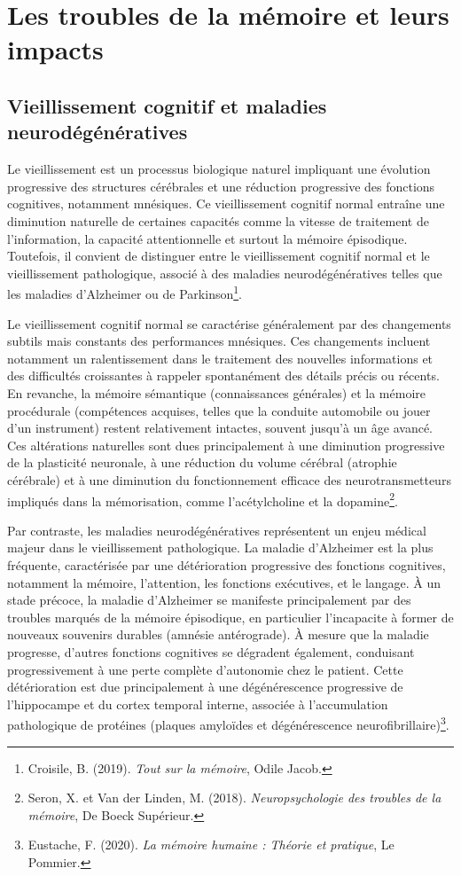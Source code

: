 \documentclass[12pt,a4paper]{report}
\begin{document}
\section{Les troubles de la mémoire et leurs impacts}

\subsection{Vieillissement cognitif et maladies neurodégénératives}

Le vieillissement est un processus biologique naturel impliquant une évolution progressive des structures cérébrales et une réduction progressive des fonctions cognitives, notamment mnésiques. Ce vieillissement cognitif normal entraîne une diminution naturelle de certaines capacités comme la vitesse de traitement de l'information, la capacité attentionnelle et surtout la mémoire épisodique. Toutefois, il convient de distinguer entre le vieillissement cognitif normal et le vieillissement pathologique, associé à des maladies neurodégénératives telles que les maladies d’Alzheimer ou de Parkinson\footnote{Croisile, B. (2019). \textit{Tout sur la mémoire}, Odile Jacob.}.

Le vieillissement cognitif normal se caractérise généralement par des changements subtils mais constants des performances mnésiques. Ces changements incluent notamment un ralentissement dans le traitement des nouvelles informations et des difficultés croissantes à rappeler spontanément des détails précis ou récents. En revanche, la mémoire sémantique (connaissances générales) et la mémoire procédurale (compétences acquises, telles que la conduite automobile ou jouer d'un instrument) restent relativement intactes, souvent jusqu'à un âge avancé. Ces altérations naturelles sont dues principalement à une diminution progressive de la plasticité neuronale, à une réduction du volume cérébral (atrophie cérébrale) et à une diminution du fonctionnement efficace des neurotransmetteurs impliqués dans la mémorisation, comme l’acétylcholine et la dopamine\footnote{Seron, X. et Van der Linden, M. (2018). \textit{Neuropsychologie des troubles de la mémoire}, De Boeck Supérieur.}.

Par contraste, les maladies neurodégénératives représentent un enjeu médical majeur dans le vieillissement pathologique. La maladie d'Alzheimer est la plus fréquente, caractérisée par une détérioration progressive des fonctions cognitives, notamment la mémoire, l’attention, les fonctions exécutives, et le langage. À un stade précoce, la maladie d'Alzheimer se manifeste principalement par des troubles marqués de la mémoire épisodique, en particulier l’incapacite à former de nouveaux souvenirs durables (amnésie antérograde). À mesure que la maladie progresse, d'autres fonctions cognitives se dégradent également, conduisant progressivement à une perte complète d’autonomie chez le patient. Cette détérioration est due principalement à une dégénérescence progressive de l’hippocampe et du cortex temporal interne, associée à l’accumulation pathologique de protéines (plaques amyloïdes et dégénérescence neurofibrillaire)\footnote{Eustache, F. (2020). \textit{La mémoire humaine : Théorie et pratique}, Le Pommier.}.
\end{document}
